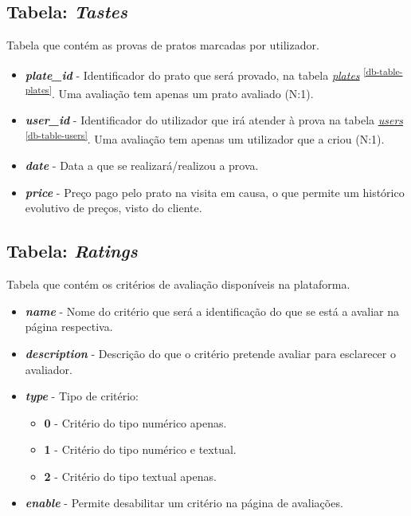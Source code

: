 \documentclass[11pt, a4paper, sans]{article}
\begin{document}
	\subsection{Tabela: \textit{Tastes}} \label{db-table-tastes}
	
	Tabela que contém as provas de pratos marcadas por utilizador.
	
	\begin{itemize}
		\item \textbf{\textit{plate\_id}} - Identificador do prato que será provado, na tabela 
			\underline{\textit{plates}} \textsuperscript{\ref{db-table-plates}}. 
			Uma avaliação tem apenas um prato avaliado (N:1).
		\item \textbf{\textit{user\_id}} - Identificador do utilizador que irá atender à prova na tabela 
			\underline{\textit{users}} \textsuperscript{\ref{db-table-users}}.
			Uma avaliação tem apenas um utilizador que a criou (N:1).	
		\item \textbf{\textit{date}} - Data a que se realizará/realizou a prova.		
		\item \textbf{\textit{price}} - Preço pago pelo prato na visita em causa, o que permite um histórico
			evolutivo de preços, visto do cliente.
	\end{itemize}

	\subsection{Tabela: \textit{Ratings}} \label{db-table-ratings}

	Tabela que contém os critérios de avaliação disponíveis na plataforma.

	\begin{itemize}
		\item \textbf{\textit{name}} - Nome do critério que será a identificação do que se está a avaliar
			na página respectiva.
		\item \textbf{\textit{description}} - Descrição do que o critério pretende avaliar para esclarecer
			o avaliador.
		\item \textbf{\textit{type}} - Tipo de critério:
			\begin{itemize}
				\item \textbf{0} - Critério do tipo numérico apenas.
				\item \textbf{1} - Critério do tipo numérico e textual.
				\item \textbf{2} - Critério do tipo textual apenas.
			\end{itemize}
		\item \textbf{\textit{enable}} - Permite desabilitar um critério na página de avaliações.
	\end{itemize}
\end{document}
